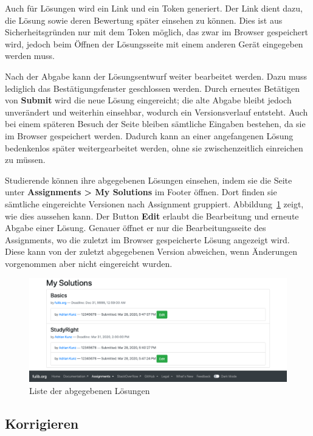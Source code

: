 Auch für Lösungen wird ein Link und ein Token generiert.
Der Link dient dazu, die Lösung sowie deren Bewertung später einsehen zu können.
Dies ist aus Sicherheitsgründen nur mit dem Token möglich, das zwar im Browser gespeichert wird, jedoch beim Öffnen der Lösungsseite mit einem anderen Gerät eingegeben werden muss.

Nach der Abgabe kann der Lösungsentwurf weiter bearbeitet werden.
Dazu muss lediglich das Bestätigungsfenster geschlossen werden.
Durch erneutes Betätigen von \textbf{Submit} wird die neue Lösung eingereicht;
die alte Abgabe bleibt jedoch unverändert und weiterhin einsehbar, wodurch ein Versionsverlauf entsteht.
Auch bei einem späteren Besuch der Seite bleiben sämtliche Eingaben bestehen, da sie im Browser gespeichert werden.
Dadurch kann an einer angefangenen Lösung bedenkenlos später weitergearbeitet werden, ohne sie zwischenzeitlich einreichen zu müssen.

Studierende können ihre abgegebenen Lösungen einsehen, indem sie die Seite unter \textbf{Assignments > My Solutions} im Footer öffnen.
Dort finden sie sämtliche eingereichte Versionen nach Assignment gruppiert.
Abbildung~\ref{fig:my-solutions} zeigt, wie dies aussehen kann.
Der Button \textbf{Edit} erlaubt die Bearbeitung und erneute Abgabe einer Lösung.
Genauer öffnet er nur die Bearbeitungsseite des Assignments, wo die zuletzt im Browser gespeicherte Lösung angezeigt wird.
Diese kann von der zuletzt abgegebenen Version abweichen, wenn Änderungen vorgenommen aber nicht eingereicht wurden.

\begin{figure}
    \centering
    \includegraphics[width=\textwidth]{chapter/fulib.org/img/my-solutions.png}
    \caption{Liste der abgegebenen Lösungen}
    \label{fig:my-solutions}
\end{figure}

\subsection{Korrigieren}\label{subsec:correcting}

